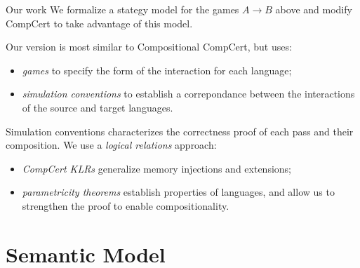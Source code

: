 \documentclass{beamer}
\begin{document}
\begin{frame}{Our work} %
We formalize a stategy model for the games $A \rightarrow B$ above
and modify CompCert to take advantage of this model.

\vspace{1em}
Our version is most similar to Compositional CompCert,
but uses:
\begin{itemize}
\item \emph{games} to specify
  the form of the interaction
  for each language;
\item \emph{simulation conventions} to
  establish a correpondance between the
  interactions of the source and target languages.
\end{itemize}

\vspace{1em}
Simulation conventions
characterizes the correctness proof of each pass
and their composition.
We use a \emph{logical relations} approach:
\begin{itemize}
\item \emph{CompCert KLRs} generalize memory injections and extensions;
\item \emph{parametricity theorems} establish properties of languages,
  and allow us to strengthen the proof to enable compositionality.
\end{itemize}

\end{frame}


\section{Semantic Model} %

%
%
\end{document}
